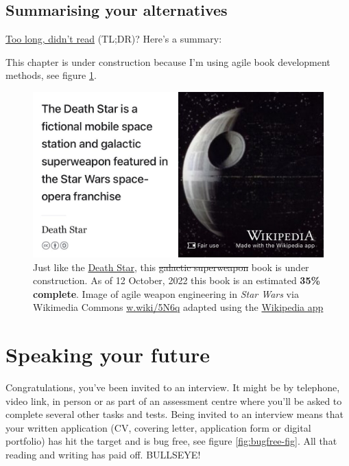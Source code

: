 \documentclass[
]{book}
\begin{document}
\hypertarget{tldr11}{%
\section{Summarising your alternatives}\label{tldr11}}

\href{https://en.wiktionary.org/wiki/too_long;_didn\%27t_read}{Too long, didn't read} (TL;DR)? Here's a summary:

This chapter is under construction because I'm using agile book development methods, see figure \ref{fig:deathstar8-fig}.

\begin{figure}

{\centering \includegraphics[width=0.99\linewidth]{images/DeathStar2} 

}

\caption{Just like the \href{https://en.wikipedia.org/wiki/Death_Star}{Death Star}, this \sout{galactic superweapon} book is under construction. As of 12 October, 2022 this book is an estimated \textbf{35\% complete}. Image of agile weapon engineering in \emph{Star Wars} via Wikimedia Commons \href{https://w.wiki/5N6q}{w.wiki/5N6q} adapted using the \href{https://apps.apple.com/gb/app/wikipedia/id324715238}{Wikipedia app}}\label{fig:deathstar8-fig}
\end{figure}

\hypertarget{speaking}{%
\chapter{Speaking your future}\label{speaking}}

Congratulations, you've been invited to an interview. It might be by telephone, video link, in person or as part of an assessment centre where you'll be asked to complete several other tasks and tests. Being invited to an interview means that your written application (CV, covering letter, application form or digital portfolio) has hit the target and is bug free, see figure \ref{fig:bugfree-fig}. All that reading and writing has paid off. BULLSEYE! 🎯
\end{document}
